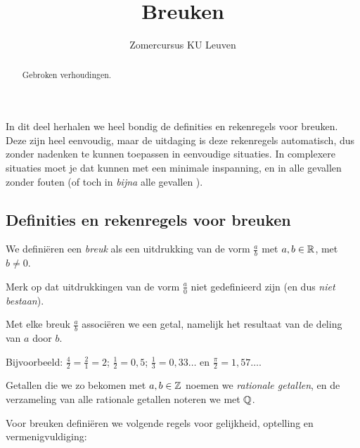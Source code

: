 \documentclass[numbers]{ximera}
\author{Zomercursus KU Leuven}
\title[Rekenvaardigheden:]{Breuken}
\begin{document}
\begin{abstract}
	Gebroken verhoudingen.
\end{abstract}
\maketitle

In dit deel herhalen we heel bondig de definities en rekenregels voor
breuken. Deze zijn heel eenvoudig, maar de uitdaging is deze rekenregels automatisch, dus zonder nadenken te kunnen toepassen in eenvoudige situaties. In complexere situaties moet je dat kunnen met een minimale inspanning, en in alle gevallen zonder fouten (of toch in \textit{bijna} alle gevallen \Smiley).

\subsection{Definities en rekenregels voor breuken}
We definiëren een \textit{breuk} als een uitdrukking van de vorm $\frac{a}{b}$ met $a,b\in\mathbb{R}$, met $b\neq0$. 


Merk op dat uitdrukkingen van de vorm $\frac a0$ niet gedefinieerd zijn (en dus \textit{niet bestaan}).  

Met elke breuk $\frac ab$ associëren we een getal, namelijk het resultaat van de deling van $a$ door $b$.

Bijvoorbeeld: $\frac42=\frac21=2$; \quad $\frac12=0,5$; \quad $\frac13=0,33\dots$ en $\frac{\pi}{2}=1,57\dots$. 

Getallen die we zo bekomen met $a,b\in\mathbb{Z}$ noemen we \textit{rationale getallen}, en de verzameling van alle rationale getallen noteren we met $\mathbb{Q}$.


Voor breuken definiëren we volgende regels voor gelijkheid, optelling en vermenigvuldiging: 
\end{document}
